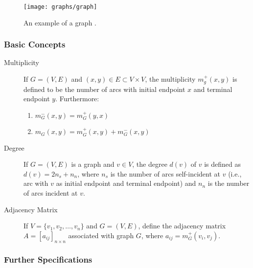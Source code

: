 \begin{figure}[H]
	\centering
	\texttt{[image: graphs/graph]}
	\caption{An example of a graph \protect\footnotemark.}
\end{figure}


\subsubsection{Basic Concepts \cite{berge1973}}
\begin{description}
	\item[Multiplicity] If $G=(V, E)$ and $(x, y) \in E \subset V\times V$, the multiplicity $m_g^+(x, y)$ is defined to be the number of arcs with initial endpoint $x$ and terminal endpoint $y$. Furthermore:
	\begin{enumerate}
		\item $m_G^-(x, y) = m_G^+(y, x)$
		\item $m_G(x, y) = m_G^+(x, y) + m_G^-(x, y)$
	\end{enumerate}

	\item[Degree] If $G=(V, E)$ is a graph and $v\in V$, the degree $d(v)$ of $v$ is defined as
	$d(v) = 2n_s  + n_n$, where $n_s$ is the number of arcs self-incident at $v$ \cite{may1972} (i.e., arc with $v$ as initial endpoint and terminal endpoint) and $n_n$ is the number of arcs incident at $v$.

	\item[Adjacency Matrix] If $V=\{v_1, v_2, \dots, v_n \}$ and $G=(V, E)$, define the adjacency matrix $A=[a_{ij}]_{n\times n}$ associated with graph $G$, where $a_{ij} = m_G^+(v_i, v_j)$.
\end{description}

\subsubsection{Further Specifications}

